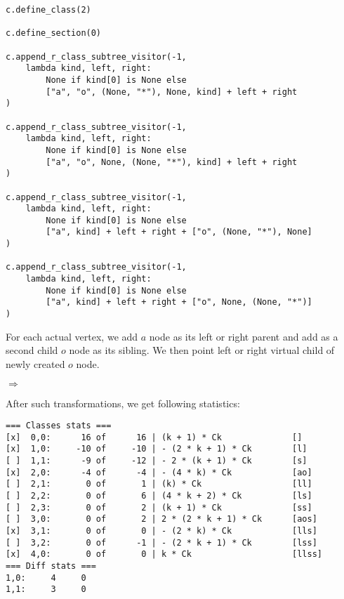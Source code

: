\documentclass[final]{article}
\theoremstyle{definition}
\theoremstyle{remark}
\newcommand{\includeinlinesvg}[2]{\begin{minipage}{#1\textwidth}\end{minipage}}
\begin{document}
\begin{lstlisting}
c.define_class(2)

c.define_section(0)

c.append_r_class_subtree_visitor(-1,
    lambda kind, left, right:
        None if kind[0] is None else
        ["a", "o", (None, "*"), None, kind] + left + right
)

c.append_r_class_subtree_visitor(-1,
    lambda kind, left, right:
        None if kind[0] is None else
        ["a", "o", None, (None, "*"), kind] + left + right
)

c.append_r_class_subtree_visitor(-1,
    lambda kind, left, right:
        None if kind[0] is None else
        ["a", kind] + left + right + ["o", (None, "*"), None]
)

c.append_r_class_subtree_visitor(-1,
    lambda kind, left, right:
        None if kind[0] is None else
        ["a", kind] + left + right + ["o", None, (None, "*")]
)
\end{lstlisting}

For each actual vertex, we add \(a\) node as its left or right parent and add as a second child \(o\) node as its sibling. We then point left or right virtual child of newly created \(o\) node.

\includeinlinesvg{.20}{lambda__trees_200__0_base}%
\(\Rightarrow\)
\includeinlinesvg{.20}{lambda__trees_200__0}%
\includeinlinesvg{.20}{lambda__trees_201__0}%
\includeinlinesvg{.20}{lambda__trees_202__0}%
\includeinlinesvg{.20}{lambda__trees_203__0}%

After such transformations, we get following statistics:

\begin{lstlisting}
=== Classes stats ===
[x]  0,0:      16 of      16 | (k + 1) * Ck              []
[x]  1,0:     -10 of     -10 | - (2 * k + 1) * Ck        [l]
[ ]  1,1:      -9 of     -12 | - 2 * (k + 1) * Ck        [s]
[x]  2,0:      -4 of      -4 | - (4 * k) * Ck            [ao]
[ ]  2,1:       0 of       1 | (k) * Ck                  [ll]
[ ]  2,2:       0 of       6 | (4 * k + 2) * Ck          [ls]
[ ]  2,3:       0 of       2 | (k + 1) * Ck              [ss]
[ ]  3,0:       0 of       2 | 2 * (2 * k + 1) * Ck      [aos]
[x]  3,1:       0 of       0 | - (2 * k) * Ck            [lls]
[ ]  3,2:       0 of      -1 | - (2 * k + 1) * Ck        [lss]
[x]  4,0:       0 of       0 | k * Ck                    [llss]
=== Diff stats ===
1,0:     4     0
1,1:     3     0
\end{lstlisting}
\end{document}
